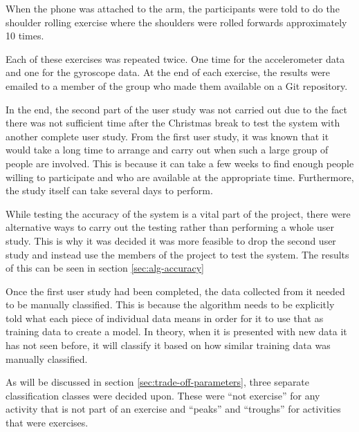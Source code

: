 When the phone was attached to the arm, the participants were told to do the shoulder rolling exercise where the shoulders were rolled forwards approximately 10 times.

Each of these exercises was repeated twice. One time for the accelerometer data and one for the gyroscope data. At the end of each exercise, the results were emailed to a member of the group who made them available on a Git repository.

In the end, the second part of the user study was not carried out due to the fact there was not sufficient time after the Christmas break to test the system with another complete user study. From the first user study, it was known that it would take a long time to arrange and carry out when such a large group of people are involved. This is because it can take a few weeks to find enough people willing to participate and who are available at the appropriate time. Furthermore, the study itself can take several days to perform. 

While testing the accuracy of the system is a vital part of the project, there were alternative ways to carry out the testing rather than performing a whole user study. This is why it was decided it was more feasible to drop the second user study and instead use the members of the project to test the system. The results of this can be seen in section \ref{sec:alg-accuracy}

Once the first user study had been completed, the data collected from it needed to be manually classified. This is because the algorithm needs to be explicitly told what each piece of individual data means in order for it to use that as training data to create a model. In theory, when it is presented with new data it has not seen before, it will classify it based on how similar training data was manually classified.

As will be discussed in section \ref{sec:trade-off-parameters}, three separate classification classes were decided upon. These were “not exercise” for any activity that is not part of an exercise and “peaks” and “troughs” for activities that were exercises. 

